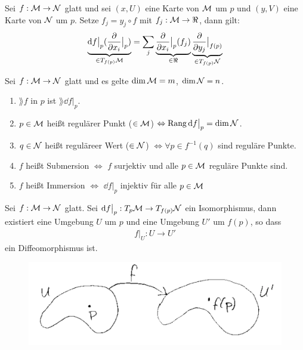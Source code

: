 \begin{satz}
Sei $f: \mathcal{M} \to \mathcal{N}$ glatt und sei $(x, U)$ eine Karte von $\mathcal{M}$ um $p$ und $(y, V)$ eine Karte von $\mathcal{N}$ um $p$.
Setze $f_j = y_j \circ f$ mit $f_j : \mfk \to \real$, dann gilt:
\begin{align}
\underbrace{\dd f \big\vert_p ( \pdv{x_i} \big\vert_p)}_{\in T_{f(p)}\mfk} = \sum_j \underbrace{\pdv{x_i}\big\vert_p (f_j)}_{\in \real} \underbrace{\pdv{y_j} \big\vert_{f(p)}}_{\in T_{f(p)}\mfka}
\end{align}
\end{satz}

\begin{defs} 
Sei $f: \mathcal{M} \to \mathcal{N}$ glatt und es gelte $\dim\mathcal{M}=m$, $\dim{\mathcal{N}} = n$.
\begin{enumerate}
\item $\rang f$ in $p$ ist $\rang \dd f \big \vert_p $.
\item $p\in\mathcal{M}$ heißt regulärer Punkt ($\in\mathcal{M}$)  $\Leftrightarrow \operatorname{Rang}\dd f \big\vert_p=\dim\mathcal{N}$.
\item $q\in\mathcal{N}$ heißt reguläreer Wert ($\in\mathcal{N}$) $\Leftrightarrow \forall p \in f	^{-1}(q)$ sind reguläre Punkte.
\item $f$ heißt Submersion $\Leftrightarrow$ $f$ surjektiv und alle $p\in\mathcal{M}$ reguläre Punkte sind.
\item $f$ heißt Immersion $\Leftrightarrow$ $\dd f \big\vert_p$ injektiv für alle $p \in \mathcal{M}$
\end{enumerate}
\end{defs}

\begin{satz}[Umkehrsatz]
\label{satz:Umkehrsatz}
Sei $f: \mathcal{M} \to \mathcal{N}$ glatt. 
Sei $\dd f \big\vert_p : T_{p} \mathcal{M} \to T_{f(p)}\mathcal{N}$ ein Isomorphismus,
dann existiert eine Umgebung $U$ um $p$ und eine Umgebung $U'$ um $f(p)$, so dass
\begin{align}
f\big\vert_U : U \to U'
\end{align}
ein Diffeomorphismus ist.
\begin{figure}[h]
\centering
\includegraphics[width=0.5\linewidth]{figures/scan/umkehrsatz.png}
\label{img:umkehrsatz}
\end{figure} 
\end{satz}

